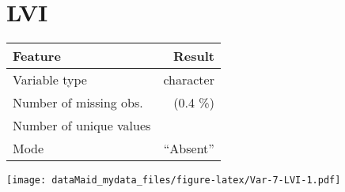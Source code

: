 \documentclass[]{report}
\begin{document}
\noindent\makebox[\linewidth]{\rule{\textwidth}{0.4pt}}

\hypertarget{lvi}{%
\section{LVI}\label{lvi}}

\begin{minipage}{0.75 \textwidth}

\begin{longtable}[]{@{}lr@{}}
\toprule
\begin{minipage}[b]{0.34\columnwidth}\raggedright
Feature\strut
\end{minipage} & \begin{minipage}[b]{0.16\columnwidth}\raggedleft
Result\strut
\end{minipage}\tabularnewline
\midrule
\endhead
\begin{minipage}[t]{0.34\columnwidth}\raggedright
Variable type\strut
\end{minipage} & \begin{minipage}[t]{0.16\columnwidth}\raggedleft
character\strut
\end{minipage}\tabularnewline
\begin{minipage}[t]{0.34\columnwidth}\raggedright
Number of missing obs.\strut
\end{minipage} & \begin{minipage}[t]{0.16\columnwidth}\raggedleft
1 (0.4 \%)\strut
\end{minipage}\tabularnewline
\begin{minipage}[t]{0.34\columnwidth}\raggedright
Number of unique values\strut
\end{minipage} & \begin{minipage}[t]{0.16\columnwidth}\raggedleft
2\strut
\end{minipage}\tabularnewline
\begin{minipage}[t]{0.34\columnwidth}\raggedright
Mode\strut
\end{minipage} & \begin{minipage}[t]{0.16\columnwidth}\raggedleft
``Absent''\strut
\end{minipage}\tabularnewline
\bottomrule
\end{longtable}

\end{minipage}
\begin{minipage}{0.25 \textwidth}

\texttt{[image: dataMaid\_mydata\_files/figure-latex/Var-7-LVI-1.pdf]}

\end{minipage}
\end{document}
